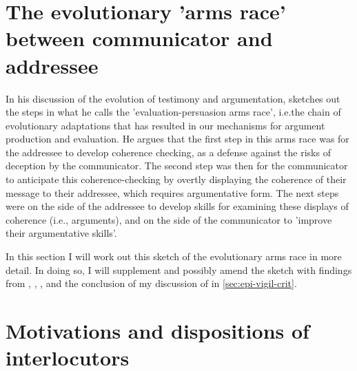 

\section{The evolutionary 'arms race' between communicator and addressee}
\label{sec:arms-race}

In his discussion of the evolution of testimony and argumentation,\citet{Sperber01} sketches out the steps in what he calls the 'evaluation-persuasion arms race', i.e.\@ the chain of evolutionary adaptations that has resulted in our mechanisms for argument production and evaluation.
He argues that the first step in this arms race was for the addressee to develop coherence checking, as a defense against the risks of deception by the communicator. The second step was then for the communicator to anticipate this coherence-checking by overtly displaying the coherence of their message to their addressee, which requires argumentative form. The next steps were on the side of the addressee to develop skills for examining these displays of coherence (i.e., arguments), and on the side of the communicator to 'improve their argumentative skills'.

In this section I will work out this sketch of the evolutionary arms race in more detail. In doing so, I will supplement and possibly amend the sketch with findings from \citet{Sperber10}, \citet{MS11}, \citet{Reboul17}, and the conclusion of my discussion of \citet{Michaelian13} in \cref{sec:epi-vigil-crit}.

\section{Motivations and dispositions of interlocutors}

